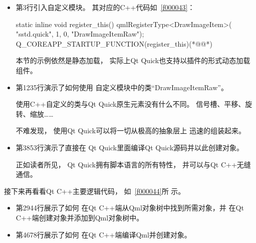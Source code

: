 \begin{itemize}

\item 第3行引入自定义模块。
其对应的C{\sourcefonttwo{}+}{\sourcefonttwo{}+}代码如\filesourcenumbernameone\ \ref{f000043}：
\label{f000043}    %
\FloatBarrier                                  %
\begin{thebookfilesourceone}[escapeinside={(*@}{@*)},
caption=GoodLuck,
title=\filesourcenumbernameone \thefilesourcenumber
,firstnumber=282]
static inline void register_this() {
    qmlRegisterType<DrawImageItem>(
        "sstd.quick",
        1, 0,
        "DrawImageItemRaw");
}
Q_COREAPP_STARTUP_FUNCTION(register_this)(*@\marginpar[\hfill\setlength\fboxsep{2pt}\fbox{\footnotesize{\kaishu\parbox{1em}{\setlength{\baselineskip}{2pt}\filesourcenumbernameone}}\footnotesize{\thefilesourcenumber}}]{\setlength\fboxsep{2pt}\fbox{\footnotesize{\kaishu\parbox{1em}{\setlength{\baselineskip}{2pt}\filesourcenumbernameone}}\footnotesize{\thefilesourcenumber}}}@*)\end{thebookfilesourceone}          %
\addtocounter{lstlisting}{-1}   %


本节的示例依然是静态加载，
实际上Qt Quick也支持以插件的形式动态加载组件。

\item 第12\raisebox{0.16ex}{\sourcefonttwo\~{}}35行演示了如何使用
自定义模块中的类“DrawImageItemRaw”。

使用C{\sourcefonttwo{}+}{\sourcefonttwo{}+}自定义的类与Qt Quick原生元素没有什么不同。
信号槽、平移、旋转、缩放……

不难发现，
使用Qt Quick可以将一切从极高的抽象层上
迅速的组装起来。

\item 第38\raisebox{0.16ex}{\sourcefonttwo\~{}}53行演示了直接在
Qt Quick里面编译Qt Quick源码并以此创建对象。

正如读者所见，
Qt Quick拥有脚本语言的所有特性，
并可以与Qt C{\sourcefonttwo{}+}{\sourcefonttwo{}+}无缝通信。

\end{itemize}

接下来再看看Qt C{\sourcefonttwo{}+}{\sourcefonttwo{}+}主要逻辑代码，
如\filesourcenumbernameone\ \ref{f000044}所
示。

\begin{itemize}

\item 第29\raisebox{0.16ex}{\sourcefonttwo\~{}}44行展示了如何
在Qt C{\sourcefonttwo{}+}{\sourcefonttwo{}+}端从Qml对象树中找到所需对象，并
在Qt C{\sourcefonttwo{}+}{\sourcefonttwo{}+}端创建对象并添加到Qml对象树中。


\item 第46\raisebox{0.16ex}{\sourcefonttwo\~{}}78行展示了如何
在Qt C{\sourcefonttwo{}+}{\sourcefonttwo{}+}端编译Qml并创建对象。

\end{itemize}

